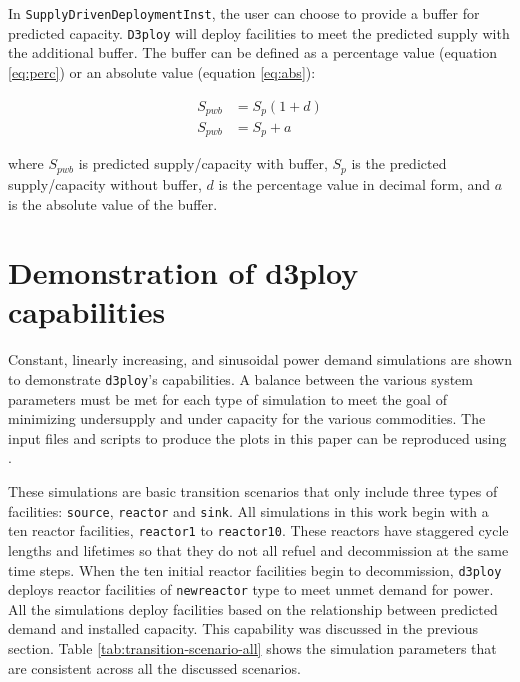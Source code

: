 \documentclass[11pt]{article}
\newcommand{\deploy}{\texttt{d3ploy}\xspace}%
\newcommand{\Deploy}{\texttt{D3ploy}\xspace}%
\begin{document}
In \texttt{SupplyDrivenDeploymentInst}, the user can choose to 
provide a buffer for predicted capacity.
\Deploy will deploy facilities to meet the predicted supply with the 
additional buffer. 
The buffer can be defined as a percentage value (equation \ref{eq:perc}) 
or an absolute value (equation \ref{eq:abs}): 

\begin{align}
            \label{eq:perc}
        S_{pwb} &= S_{p}(1+d)\\
            \label{eq:abs}
        S_{pwb} &= S_{p}+a
\end{align}

where $S_{pwb}$ is predicted supply/capacity with buffer, 
$S_p$ is the predicted supply/capacity without buffer, 
$d$ is the percentage value in decimal form, 
and $a$ is the absolute value of the buffer. 

\section{Demonstration of d3ploy capabilities}
Constant, linearly increasing, and sinusoidal power demand simulations
are shown to demonstrate \deploy's capabilities. 
A balance between the various system parameters must be 
met for each type of simulation to meet the goal of 
minimizing undersupply and under capacity for the various 
commodities. 
The input files and scripts to produce the plots in this paper 
can be reproduced using \cite{d3ploy_doi_2019}.

These simulations are basic transition scenarios that only include
three types of facilities: \texttt{source}, \texttt{reactor} and 
\texttt{sink}.
All simulations in this work begin with a ten reactor facilities, 
\texttt{reactor1} to \texttt{reactor10}. 
These reactors have staggered cycle lengths and lifetimes 
so that they do not all refuel and decommission at the same time 
steps. 
When the ten initial reactor facilities begin to decommission, 
\deploy deploys reactor facilities of \texttt{newreactor} type
to meet unmet demand for power. 
All the simulations deploy facilities based on the relationship
between predicted demand and installed capacity. 
This capability was discussed in the previous section.  
Table \ref{tab:transition-scenario-all} shows the simulation 
parameters that are consistent across all the discussed 
scenarios. 
\end{document}
